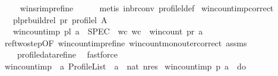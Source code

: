 \begin{isabellebody}
\ \ \isamarkupfalse%
\ \ winsr{\isacharunderscore}{\kern0pt}imp{\isacharunderscore}{\kern0pt}refine\isanewline
\ \ \ \ \isamarkupfalse%
\ {\isacharparenleft}{\kern0pt}metis\ in{\isacharunderscore}{\kern0pt}br{\isacharunderscore}{\kern0pt}conv\ profile{\isacharunderscore}{\kern0pt}l{\isacharunderscore}{\kern0pt}def{\isacharparenright}{\kern0pt}%
\endisatagproof
{\isafoldproof}%
%
\isadelimproof
\isanewline
%
\endisadelimproof
\isanewline
{}\isamarkupfalse%
\ win{\isacharunderscore}{\kern0pt}count{\isacharunderscore}{\kern0pt}imp{\isacharunderscore}{\kern0pt}correct{\isacharcolon}{\kern0pt}\isanewline
\ \ \ {\isachardoublequoteopen}{\isacharparenleft}{\kern0pt}pl{\isacharcomma}{\kern0pt}pr{\isacharparenright}{\kern0pt}{\isasymin}build{\isacharunderscore}{\kern0pt}rel\ pr{}{\isacharunderscore}{\kern0pt}{\isasymalpha}\ {\isacharparenleft}{\kern0pt}profile{\isacharunderscore}{\kern0pt}l\ A{\isacharparenright}{\kern0pt}{\isachardoublequoteclose}\isanewline
\ \ \ {\isachardoublequoteopen}win{\isacharunderscore}{\kern0pt}count{\isacharunderscore}{\kern0pt}imp\ pl\ a\ {\isasymle}\ SPEC\ {\isacharparenleft}{\kern0pt}{\isasymlambda}\ wc{\isachardot}{\kern0pt}\ wc\ {\isacharequal}{\kern0pt}\ win{\isacharunderscore}{\kern0pt}count\ pr\ a{\isacharparenright}{\kern0pt}{\isachardoublequoteclose}\isanewline
%
\isadelimproof
\ \ %
\endisadelimproof
%
\isatagproof
{}\isamarkupfalse%
\ ref{\isacharunderscore}{\kern0pt}two{\isacharunderscore}{\kern0pt}step{\isacharbrackleft}{\kern0pt}OF\ win{\isacharunderscore}{\kern0pt}count{\isacharunderscore}{\kern0pt}imp{\isacharunderscore}{\kern0pt}refine\ win{\isacharunderscore}{\kern0pt}count{\isacharunderscore}{\kern0pt}mon{\isacharunderscore}{\kern0pt}outer{\isacharunderscore}{\kern0pt}correct{\isacharbrackright}{\kern0pt}\ assms\isanewline
\ \ \ \ profile{\isacharunderscore}{\kern0pt}data{\isacharunderscore}{\kern0pt}refine\ \isamarkupfalse%
\ fastforce%
\endisatagproof
{\isafoldproof}%
%
\isadelimproof
\isanewline
%
\endisadelimproof
\ \ \isanewline
\ \ \isanewline
{}\isamarkupfalse%
\ win{\isacharunderscore}{\kern0pt}count{\isacharunderscore}{\kern0pt}imp{\isacharprime}{\kern0pt}\ {\isacharcolon}{\kern0pt}{\isacharcolon}{\kern0pt}\ {\isachardoublequoteopen}{\isacharprime}{\kern0pt}a\ Profile{\isacharunderscore}{\kern0pt}List\ {\isasymRightarrow}\ {\isacharprime}{\kern0pt}a\ {\isasymRightarrow}\ nat\ nres{\isachardoublequoteclose}\ \isanewline
{\isachardoublequoteopen}win{\isacharunderscore}{\kern0pt}count{\isacharunderscore}{\kern0pt}imp{\isacharprime}{\kern0pt}\ p\ a\ {\isasymequiv}\ do\ {\isacharbraceleft}{\kern0pt}\isanewline

\end{isabellebody}
